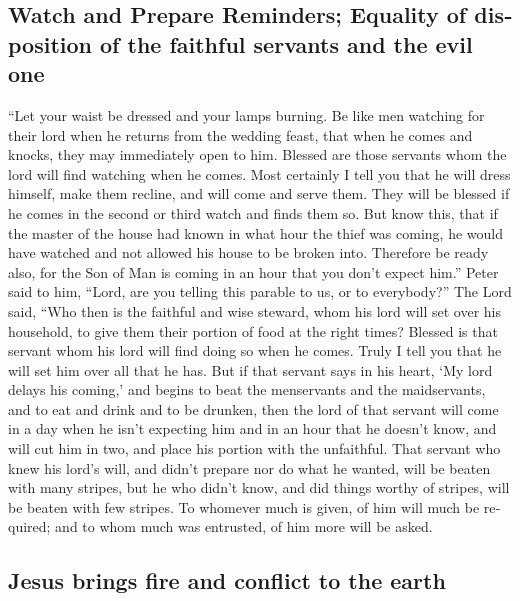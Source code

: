 \begin{paracol}{2}
\begin{otherlanguage}{english}
\hypertarget{watch-and-prepare-reminders-equality-of-disposition-of-the-faithful-servants-and-the-evil-one}{%
\subsection{Watch and Prepare Reminders; Equality of disposition of the
faithful servants and the evil
one}\label{watch-and-prepare-reminders-equality-of-disposition-of-the-faithful-servants-and-the-evil-one}}

 ``Let your waist be dressed and your lamps burning.
 Be like men watching for their lord when he returns from
the wedding feast, that when he comes and knocks, they may immediately
open to him.  Blessed are those servants whom the lord
will find watching when he comes. Most certainly I tell you that he will
dress himself, make them recline, and will come and serve them.
 They will be blessed if he comes in the second or third
watch and finds them so.  But know this, that if the
master of the house had known in what hour the thief was coming, he
would have watched and not allowed his house to be broken into.
 Therefore be ready also, for the Son of Man is coming in
an hour that you don't expect him.''  Peter said to him,
``Lord, are you telling this parable to us, or to everybody?''
 The Lord said, ``Who then is the faithful and wise
steward, whom his lord will set over his household, to give them their
portion of food at the right times?  Blessed is that
servant whom his lord will find doing so when he comes. 
Truly I tell you that he will set him over all that he has.
 But if that servant says in his heart, `My lord delays
his coming,' and begins to beat the menservants and the maidservants,
and to eat and drink and to be drunken,  then the lord of
that servant will come in a day when he isn't expecting him and in an
hour that he doesn't know, and will cut him in two, and place his
portion with the unfaithful.  That servant who knew his
lord's will, and didn't prepare nor do what he wanted, will be beaten
with many stripes,  but he who didn't know, and did
things worthy of stripes, will be beaten with few stripes. To whomever
much is given, of him will much be required; and to whom much was
entrusted, of him more will be asked.

\hypertarget{jesus-brings-fire-and-conflict-to-the-earth}{%
\subsection{Jesus brings fire and conflict to the
earth}\label{jesus-brings-fire-and-conflict-to-the-earth}}


\end{otherlanguage}
\end{paracol}
